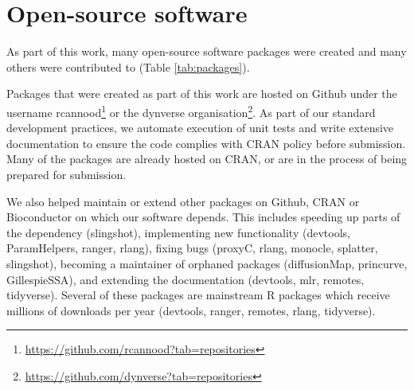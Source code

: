 \section{Open-source software}
As part of this work, many open-source software packages were created and many others were contributed to (Table \ref{tab:packages}). 

Packages that were created as part of this work are hosted on Github under the username rcannood\footnote{\url{https://github.com/rcannood?tab=repositories}} or the dynverse organisation\footnote{\url{https://github.com/dynverse?tab=repositories}}. As part of our standard development practices, we automate execution of unit tests and write extensive documentation to ensure the code complies with CRAN policy before submission. Many of the packages are already hosted on CRAN, or are in the process of being prepared for submission.

We also helped maintain or extend other packages on Github, CRAN or Bioconductor on which our software depends. This includes speeding up parts of the dependency (slingshot), implementing new functionality (devtools, ParamHelpers, ranger, rlang), fixing bugs (proxyC, rlang, monocle, splatter, slingshot), becoming a maintainer of orphaned packages (diffusionMap, princurve, GillespieSSA), and extending the documentation (devtools, mlr, remotes, tidyverse). Several of these packages are mainstream R packages which receive millions of downloads per year (devtools, ranger, remotes, rlang, tidyverse).

\newcommand{\cranpkg}[1]{\href{https://cran.r-project.org/package=#1}{#1}}
\newcommand{\biocpkg}[1]{\href{https://bioconductor.org/packages/#1}{#1}}
\newcommand{\biocpkgl}[2]{\href{https://bioconductor.org/packages/#1}{#2}}
\newcommand{\githubpkg}[2]{\href{https://github.com/#1/#2}{#2}}
\newcommand{\notavailable}{}

